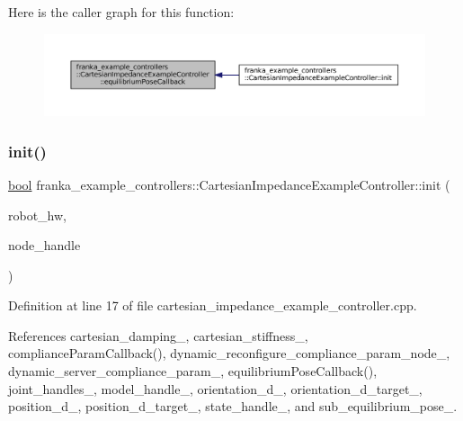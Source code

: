 Here is the caller graph for this function\+:
\nopagebreak
\begin{figure}[H]
\begin{center}
\leavevmode
\includegraphics[width=350pt]{classfranka__example__controllers_1_1CartesianImpedanceExampleController_a84a8c0fb5fbb0c273910d1af68fabe0b_icgraph}
\end{center}
\end{figure}
\mbox{\label{classfranka__example__controllers_1_1CartesianImpedanceExampleController_aa61fee8f409bbfda931c202123dbd7f5}} 
\subsubsection{\texorpdfstring{init()}{init()}}
{\footnotesize\ttfamily \hyperlink{classbool}{bool} franka\+\_\+example\+\_\+controllers\+::\+Cartesian\+Impedance\+Example\+Controller\+::init (\begin{DoxyParamCaption}\item[{hardware\+\_\+interface\+::\+Robot\+HW $\ast$}]{robot\+\_\+hw,  }\item[{ros\+::\+Node\+Handle \&}]{node\+\_\+handle }\end{DoxyParamCaption})\hspace{0.3cm}{\ttfamily [override]}}



Definition at line 17 of file cartesian\+\_\+impedance\+\_\+example\+\_\+controller.\+cpp.



References cartesian\+\_\+damping\+\_\+, cartesian\+\_\+stiffness\+\_\+, compliance\+Param\+Callback(), dynamic\+\_\+reconfigure\+\_\+compliance\+\_\+param\+\_\+node\+\_\+, dynamic\+\_\+server\+\_\+compliance\+\_\+param\+\_\+, equilibrium\+Pose\+Callback(), joint\+\_\+handles\+\_\+, model\+\_\+handle\+\_\+, orientation\+\_\+d\+\_\+, orientation\+\_\+d\+\_\+target\+\_\+, position\+\_\+d\+\_\+, position\+\_\+d\+\_\+target\+\_\+, state\+\_\+handle\+\_\+, and sub\+\_\+equilibrium\+\_\+pose\+\_\+.


